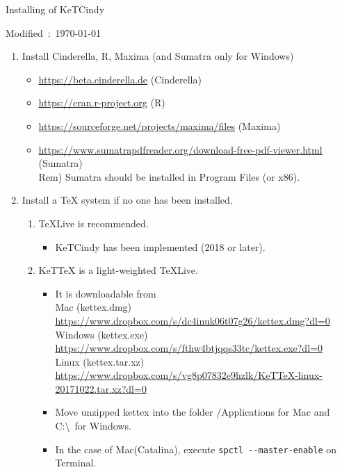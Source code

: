 \documentclass{article}
\begin{document}
\begin{center}
Installing of KeTCindy 
\end{center}

\hfill Modified\ :\ \today

\begin{enumerate}[\bf\large 1.]
\item Install Cinderella, R, Maxima (and Sumatra only for Windows)
 \begin{itemize}
 \item \url{https://beta.cinderella.de}  (Cinderella)
 \item \url{https://cran.r-project.org}   (R)
 \item \url{https://sourceforge.net/projects/maxima/files}  (Maxima)
 \item \url{https://www.sumatrapdfreader.org/download-free-pdf-viewer.html} (Sumatra)\\
\hspace*{5mm}Rem) Sumatra should be installed in Program Files (or x86).
 \end{itemize}
\item Install a TeX system if no one has been installed.
 \begin{enumerate}[(1)]
 \item TeXLive is recommended.
    \begin{itemize}
    \item KeTCindy has been implemented (2018 or later).
    \end{itemize}
 \item KeTTeX is a light-weighted TeXLive.
    \begin{itemize}
    \item It is downloadable from\\
    \hspace*{5mm}Mac (kettex.dmg)\\
    \hspace*{10mm}\url{https://www.dropbox.com/s/dc4inuk06t07g26/kettex.dmg?dl=0}\\
    \hspace*{5mm}Windows (kettex.exe)\\
    \hspace*{10mm}\url{https://www.dropbox.com/s/fthw4btjqqs33tc/kettex.exe?dl=0}\\
    \hspace*{5mm}Linux (kettex.tar.xz)\\
    \hspace*{10mm}\url{https://www.dropbox.com/s/vg8p07832e9hzlk/KeTTeX-linux-20171022.tar.xz?dl=0}
     \item Move unzipped kettex into the folder /Applications for Mac and C:\textbackslash\ for Windows.
     \item In the case of Mac(Catalina), execute \verb|spctl --master-enable| on Terminal.
    \end{itemize}
 \end{enumerate}


\end{enumerate}
\end{document}
